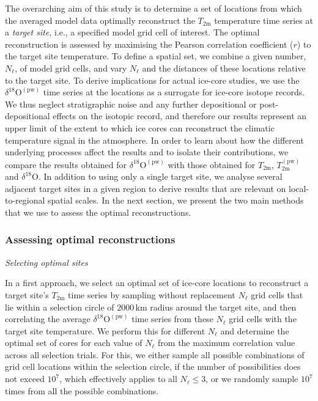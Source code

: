 \documentclass[cp, manuscript]{copernicus}
\begin{document}
The overarching aim of this study is to determine a set of locations from which
the averaged model data optimally reconstruct the $T_{2\mathrm{m}}$ temperature
time series at a \emph{target site}, i.e., a specified model grid cell of
interest. The optimal reconstruction is assessed by maximising the Pearson
correlation coefficient ($r$) to the target site temperature. To define a
spatial set, we combine a given number, $N_{\ell}$, of model grid cells, and
vary $N_{\ell}$ and the distances of these locations relative to the target
site. To derive implications for actual ice-core studies, we use the
$\delta^{18}\mathrm{O}^{\mathrm{(pw)}}$ time series at the locations as a
surrogate for ice-core isotope records. We thus neglect stratigraphic noise and
any further depositional or post-depositional effects on the isotopic record,
and therefore our results represent an upper limit of the extent to which ice
cores can reconstruct the climatic temperature signal in the atmosphere. In
order to learn about how the different underlying processes affect the results
and to isolate their contributions, we compare the results obtained for
$\delta^{18}\mathrm{O}^{\mathrm{(pw)}}$ with those obtained for
$T_{2\mathrm{m}}$, $T_{2\mathrm{m}}^{\mathrm{(pw)}}$ and
$\delta^{18}\mathrm{O}$. In addition to using only a single target site, we
analyse several adjacent target sites in a given region to derive results that
are relevant on local-to-regional spatial scales. In the next section, we
present the two main methods that we use to assess the optimal reconstructions.

\subsubsection{Assessing optimal reconstructions}\label{methods:opt.sampling}

\emph{Selecting optimal sites}

\noindent
In a first approach, we select an optimal set of ice-core locations to
reconstruct a target site's $T_{2\mathrm{m}}$ time series by sampling without
replacement $N_{\ell}$ grid cells that lie within a selection circle of
$2000$\,km radius around the target site, and then correlating the average
$\delta^{18}\mathrm{O}^{\mathrm{(pw)}}$ time series from these $N_{\ell}$ grid
cells with the target site temperature. We perform this for different $N_{\ell}$
and determine the optimal set of cores for each value of $N_{\ell}$ from the
maximum correlation value across all selection trials. For this, we either
sample all possible combinations of grid cell locations within the selection
circle, if the number of possibilities does not exceed $10^7$, which effectively
applies to all $N_{\ell}\le3$, or we randomly sample $10^7$ times from all the
possible combinations.\newline
\end{document}
